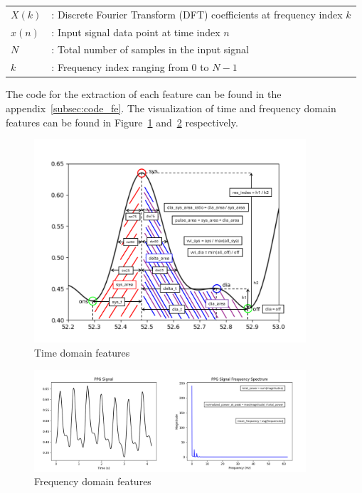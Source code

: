 \begin{flushleft}
    \small
    \begin{tabular}{ll}
        $X(k)$      & : Discrete Fourier Transform (DFT) coefficients at frequency index $k$ \\
        $x(n)$      & : Input signal data point at time index $n$                            \\
        $N$         & : Total number of samples in the input signal                            \\
        $k$         & : Frequency index ranging from $0$ to $N-1$                               \\
    \end{tabular}
\end{flushleft}

The code for the extraction of each feature can be found in the appendix~\ref{subsec:code_fe}.
The visualization of time and frequency domain features can be found in Figure~\ref{fig:td_feats} and~\ref{fig:fd_feats} respectively.

\begin{figure}[h]
    \includegraphics[width=0.9\textwidth]{images/methods/feats}
    \caption{Time domain features}
    \label{fig:td_feats}
\end{figure}

\begin{figure}[h]
    \includegraphics[width=0.9\textwidth]{images/methods/median_fft}
    \caption{Frequency domain features}
    \label{fig:fd_feats}
\end{figure}

